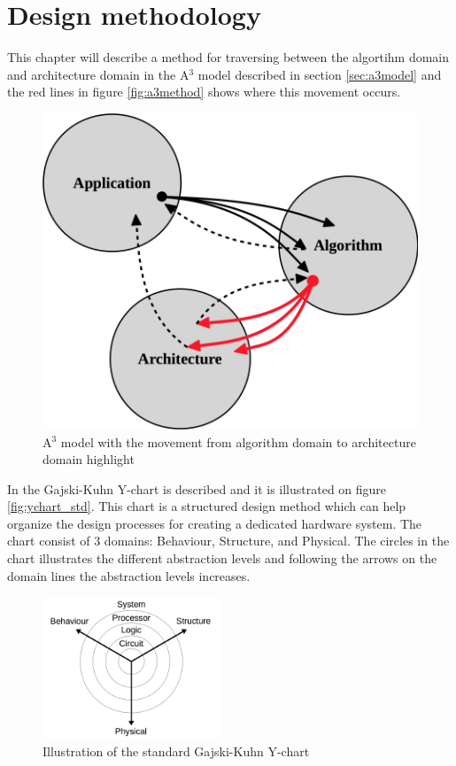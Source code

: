 \chapter{Design methodology} \label{ch:designmet}
This chapter will describe a method for traversing between the algortihm domain and architecture domain in the A$^3$ model described in section \vref{sec:a3model} and the red lines in figure \vref{fig:a3method} shows where this movement occurs.\\

\begin{figure}[ht!]
  \centering
  \includegraphics[scale=0.25]{figures/a3design}
  \caption{A$^3$ model with the movement from algorithm domain to architecture domain highlight}
  \label{fig:a3method}
\end{figure}

In \cite{gajski2009} the Gajski-Kuhn Y-chart is described and it is illustrated on figure \vref{fig:ychart_std}. This chart is a structured design method which can help organize the design processes for creating a dedicated hardware system. The chart consist of 3 domains: Behaviour, Structure, and Physical. The circles in the chart illustrates the different abstraction levels and following the arrows on the domain lines the abstraction levels increases.\\

\begin{figure}[ht!]
  \centering
  \includegraphics[width=0.475\textwidth]{figures/ychart-std.jpg}
  \caption{Illustration of the standard Gajski-Kuhn Y-chart \cite{gajski2009}\label{fig:ychart_std}}
\end{figure}

